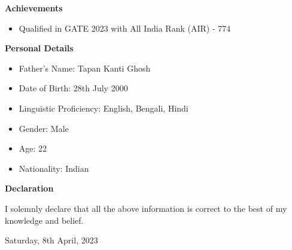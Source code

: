 \documentclass[a4paper,10pt]{article}
\newcommand{\resitem}[1]{\item #1}
\newcommand{\resheading}[1]{\vspace{0.5em} {\small \colorbox{mygrey}{{\begin{minipage}{0.975\textwidth}{{\textbf{#1}}}\end{minipage}}}} \vspace{0.5em}}
\begin{document}
\resheading{Achievements}
\begin{itemize}[noitemsep]
    \resitem{Qualified in GATE 2023 with All India Rank (AIR) - 774}
\end{itemize}

\resheading{Personal Details}
\begin{itemize}[noitemsep]
    \resitem{Father’s Name: Tapan Kanti Ghosh}
    \resitem{Date of Birth: 28th July 2000}
    \resitem{Linguistic Proficiency: English, Bengali, Hindi}
    \resitem{Gender: Male}
    \resitem{Age: 22}
    \resitem{Nationality: Indian}
\end{itemize}

\resheading{Declaration}
I solemnly declare that all the above information is correct to the best of my knowledge and belief.

\vspace{0.5cm}
Saturday, 8th April, 2023
\end{document}
